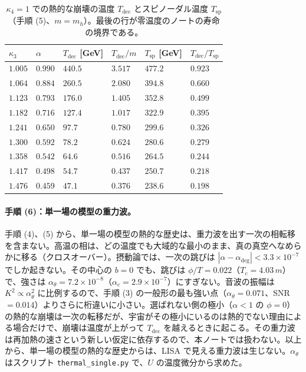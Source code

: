 \documentclass[a4paper,10pt]{ltjsarticle}
\begin{document}
\begin{table}[tbp]
\centering\small
\caption{$\kappa_4=1$ での熱的な崩壊の温度 $T_{\mathrm{dec}}$ とスピノーダル温度 $T_{\mathrm{sp}}$（手順 (5)、$m=m_h$）。最後の行が零温度のノートの寿命の境界である。}
\label{tab:stability}
\begin{tabular}{llllll}
\toprule
$\kappa_3$ & $\alpha$ & $T_{\mathrm{dec}}$ [GeV] & $T_{\mathrm{dec}}/m$ & $T_{\mathrm{sp}}$ [GeV] & $T_{\mathrm{dec}}/T_{\mathrm{sp}}$ \\
\midrule
$1.005$ & $0.990$ & $440.5$ & $3.517$ & $477.2$ & $0.923$ \\
$1.064$ & $0.884$ & $260.5$ & $2.080$ & $394.8$ & $0.660$ \\
$1.123$ & $0.793$ & $176.0$ & $1.405$ & $352.8$ & $0.499$ \\
$1.182$ & $0.716$ & $127.4$ & $1.017$ & $322.9$ & $0.395$ \\
$1.241$ & $0.650$ & $97.7$ & $0.780$ & $299.6$ & $0.326$ \\
$1.300$ & $0.592$ & $78.2$ & $0.624$ & $280.6$ & $0.279$ \\
$1.358$ & $0.542$ & $64.6$ & $0.516$ & $264.5$ & $0.244$ \\
$1.417$ & $0.498$ & $54.7$ & $0.437$ & $250.7$ & $0.218$ \\
$1.476$ & $0.459$ & $47.1$ & $0.376$ & $238.6$ & $0.198$ \\
\bottomrule
\end{tabular}
\end{table}

\paragraph{手順 (6)：単一場の模型の重力波。}手順 (4)、(5) から、単一場の模型の熱的な歴史は、重力波を出す一次の相転移を含まない。高温の相は、どの温度でも大域的な最小のまま、真の真空へなめらかに移る（クロスオーバー）。摂動論では、一次の跳びは $|\alpha-\alpha_{\mathrm{deg}}|<3.3\times10^{-7}$ でしか起きない。その中心の $b=0$ でも、跳びは $\phi/T=0.022$（$T_c=4.03\,m$）で、強さは $\alpha_\theta=7.2\times10^{-8}$（$\alpha_e=2.9\times10^{-7}$）にすぎない。音波の振幅は $K^2\propto\alpha_\theta^2$ に比例するので、手順 (3) の一般形の最も強い点（$\alpha_\theta=0.071$、SNR $=0.014$）よりさらに桁違いに小さい。選ばれない側の極小（$\alpha<1$ の $\phi=0$）の熱的な崩壊は一次の転移だが、宇宙がその極小にいるのは熱的でない理由による場合だけで、崩壊は温度が上がって $T_{\mathrm{dec}}$ を越えるときに起こる。その重力波は再加熱の速さという新しい仮定に依存するので、本ノートでは扱わない。以上から、単一場の模型の熱的な歴史からは、LISA で見える重力波は生じない。$\alpha_\theta$ はスクリプト \texttt{thermal\_single.py} で、$U$ の温度微分から求めた。
\end{document}
